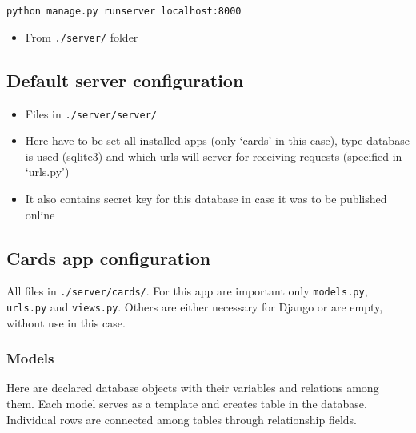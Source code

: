\documentclass[12pt]{article}
\providecommand{\tightlist}{\setlength{\itemsep}{1pt}\setlength{\parskip}{1pt}}
\let\oldtexttt\texttt
\renewcommand{\texttt}[1]{\oldtexttt{\textcolor{codehighlight}{#1}}}
\begin{document}
\texttt{python\ manage.py\ runserver\ localhost:8000}

\begin{itemize}
\tightlist
\item
  From \texttt{./server/} folder
\end{itemize}

\hypertarget{default-server-configuration}{%
\subsection{Default server
configuration}\label{default-server-configuration}}

\begin{itemize}
\tightlist
\item
  Files in \texttt{./server/server/}
\item
  Here have to be set all installed apps (only `cards' in this case),
  type database is used (sqlite3) and which urls will server for
  receiving requests (specified in `urls.py')
\item
  It also contains secret key for this database in case it was to be
  published online
\end{itemize}

\hypertarget{cards-app-configuration}{%
\subsection{Cards app configuration}\label{cards-app-configuration}}

All files in \texttt{./server/cards/}. For this app are important only
\texttt{models.py}, \texttt{urls.py} and \texttt{views.py}. Others are
either necessary for Django or are empty, without use in this case.

\hypertarget{models}{%
\subsubsection{Models}\label{models}}

Here are declared database objects with their variables and relations
among them. Each model serves as a template and creates table in the
database. Individual rows are connected among tables through
relationship fields.
\end{document}
